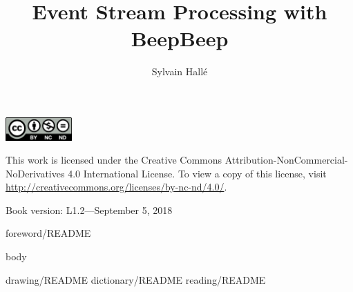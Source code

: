 \documentclass{lifmanual}
\title{Event Stream Processing with BeepBeep}
\author{Sylvain Hallé}
\begin{document}
\frontmatter

\newpage

\cleardoublepage

\newpage

\thispagestyle{empty}
\pagestyle{empty}
\rule{0in}{6in}
\noindent
\includegraphics[width=1in]{by-nc-nd}\\
{\sf\small
\noindent
This work is licensed under the Creative Commons Attribution-NonCommercial-NoDerivatives 4.0 International License. To view a copy of this license, visit \url{http://creativecommons.org/licenses/by-nc-nd/4.0/}.\\

\noindent
\rule{0in}{8pt}
\noindent
Book version: L1.2---September 5, 2018}


\pagestyle{toc}
\tableofcontents
\newpage
{foreword/README}

\mainmatter
\thispagestyle{normal}
\pagestyle{normal}

{body}

\appendix
\renewcommand{\chaptername}{Appendix}
{drawing/README}
{dictionary/README}
{reading/README}

\pagestyle{index}
\printindex

\cleardoublepage
\thispagestyle{empty}
\phantom{W}
\newpage

\end{document}
